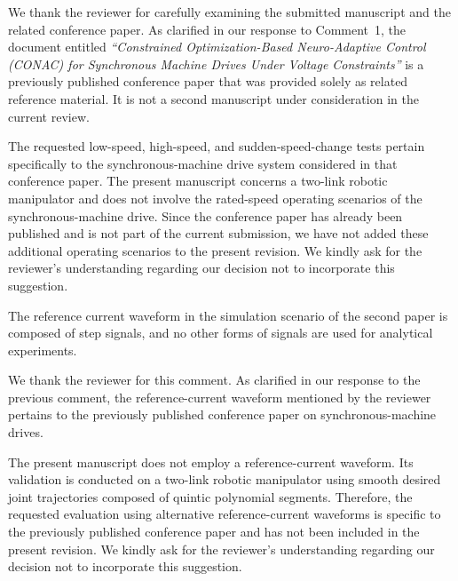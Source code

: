 \documentclass[12pt,english]{reviewresponse}
\begin{document}
\begin{revresponse}
  We thank the reviewer for carefully examining the submitted manuscript and the related conference paper. 
  As clarified in our response to Comment~1, the document entitled \textit{``Constrained Optimization-Based Neuro-Adaptive Control (CONAC) for Synchronous Machine Drives Under Voltage Constraints''} is a previously published conference paper that was provided solely as related reference material. It is not a second manuscript under consideration in the current review.

  \bigskip

  The requested low-speed, high-speed, and sudden-speed-change tests pertain specifically to the synchronous-machine drive system considered in that conference paper. 
  The present manuscript concerns a two-link robotic manipulator and does not involve the rated-speed operating scenarios of the synchronous-machine drive. 
  Since the conference paper has already been published and is not part of the current submission, we have not added these additional operating scenarios to the present revision.
  We kindly ask for the reviewer’s understanding regarding our decision not to incorporate this suggestion.
  
\end{revresponse}

% 
\begin{revcomment}[2][1]{}
	The reference current waveform in the simulation scenario of the second paper is composed of step signals, and no other forms of signals are used for analytical experiments.
\end{revcomment}

\begin{revresponse}
  We thank the reviewer for this comment. 
  As clarified in our response to the previous comment, the reference-current waveform mentioned by the reviewer pertains to the previously published conference paper on synchronous-machine drives.

  The present manuscript does not employ a reference-current waveform. 
  Its validation is conducted on a two-link robotic manipulator using smooth desired joint trajectories composed of quintic polynomial segments. 
  Therefore, the requested evaluation using alternative reference-current waveforms is specific to the previously published conference paper and has not been included in the present revision.
  We kindly ask for the reviewer’s understanding regarding our decision not to incorporate this suggestion.
\end{revresponse}
\end{document}
